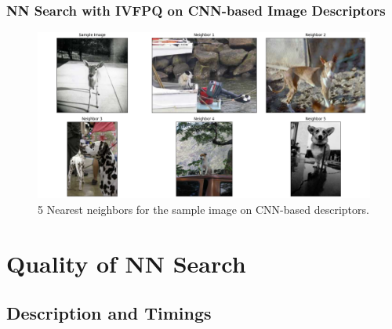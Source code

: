 \begin{frame}
\frametitle{NN Search with IVFPQ on CNN-based Image Descriptors}

\begin{figure}
\centering
\includegraphics[width=0.85\linewidth,height=0.65\textheight]{../images/kgraph/visual_assessment}
\caption{5 Nearest neighbors for the sample image on CNN-based descriptors.}
\end{figure}

\end{frame}


\section{Quality of NN Search}
\subsection{Description and Timings}

